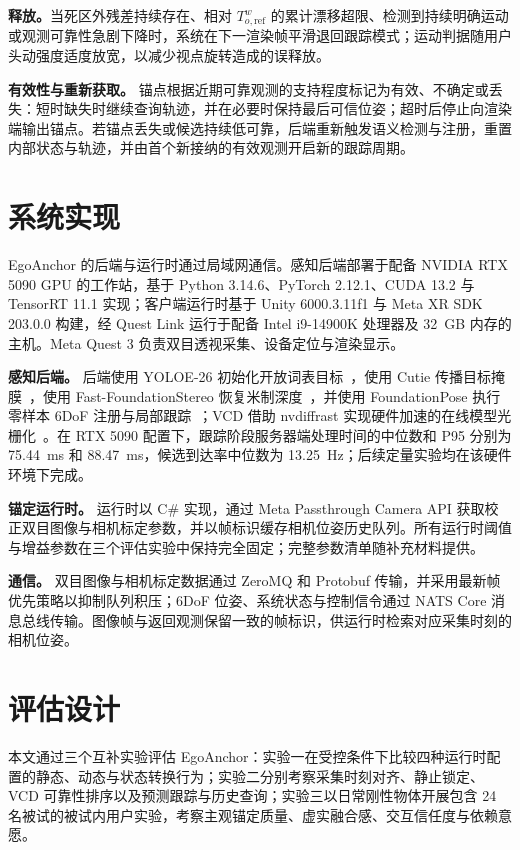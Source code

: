 \documentclass[review]{vgtc}
\begin{document}
\textbf{释放。}当死区外残差持续存在、相对 $T_{o,\mathrm{ref}}^w$ 的累计漂移超限、检测到持续明确运动或观测可靠性急剧下降时，系统在下一渲染帧平滑退回跟踪模式；运动判据随用户头动强度适度放宽，以减少视点旋转造成的误释放。

\textbf{有效性与重新获取。}\label{sec:validity}
锚点根据近期可靠观测的支持程度标记为有效、不确定或丢失：短时缺失时继续查询轨迹，并在必要时保持最后可信位姿；超时后停止向渲染端输出锚点。若锚点丢失或候选持续低可靠，后端重新触发语义检测与注册，重置内部状态与轨迹，并由首个新接纳的有效观测开启新的跟踪周期。

\section{系统实现}\label{sec:implementation}

EgoAnchor 的后端与运行时通过局域网通信。感知后端部署于配备 NVIDIA RTX 5090 GPU 的工作站，基于 Python 3.14.6、PyTorch 2.12.1、CUDA 13.2 与 TensorRT 11.1 实现；客户端运行时基于 Unity 6000.3.11f1 与 Meta XR SDK 203.0.0 构建，经 Quest Link 运行于配备 Intel i9-14900K 处理器及 32~GB 内存的主机。Meta Quest 3 负责双目透视采集、设备定位与渲染显示。

\textbf{感知后端。}
后端使用 YOLOE-26 初始化开放词表目标~\cite{yoloe2025}，使用 Cutie 传播目标掩膜~\cite{cutie2024}，使用 Fast-FoundationStereo 恢复米制深度~\cite{fastfoundationstereo2026}，并使用 FoundationPose 执行零样本 6DoF 注册与局部跟踪~\cite{foundationpose2024}；VCD 借助 nvdiffrast 实现硬件加速的在线模型光栅化~\cite{nvdiffrast2020}。在 RTX 5090 配置下，跟踪阶段服务器端处理时间的中位数和 P95 分别为 75.44~ms 和 88.47~ms，候选到达率中位数为 13.25~Hz；后续定量实验均在该硬件环境下完成。

\textbf{锚定运行时。}
运行时以 C\# 实现，通过 Meta Passthrough Camera API 获取校正双目图像与相机标定参数，并以帧标识缓存相机位姿历史队列。所有运行时阈值与增益参数在三个评估实验中保持完全固定；完整参数清单随补充材料提供。

\textbf{通信。}
双目图像与相机标定数据通过 ZeroMQ 和 Protobuf 传输，并采用最新帧优先策略以抑制队列积压；6DoF 位姿、系统状态与控制信令通过 NATS Core 消息总线传输。图像帧与返回观测保留一致的帧标识，供运行时检索对应采集时刻的相机位姿。

\section{评估设计}\label{sec:evaluation}

本文通过三个互补实验评估 EgoAnchor：实验一在受控条件下比较四种运行时配置的静态、动态与状态转换行为；实验二分别考察采集时刻对齐、静止锁定、VCD 可靠性排序以及预测跟踪与历史查询；实验三以日常刚性物体开展包含 24 名被试的被试内用户实验，考察主观锚定质量、虚实融合感、交互信任度与依赖意愿。
\end{document}
